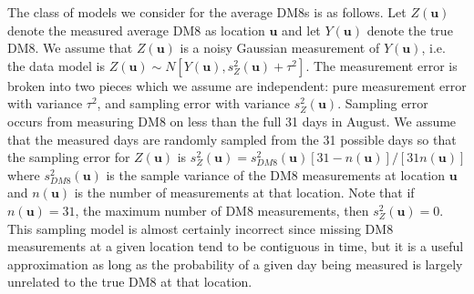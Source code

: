 \documentclass[12pt]{article}
\begin{document}
The class of models we consider for the average DM8s is as follows. Let $Z(\bm{u})$ denote the measured average DM8 as location $\bm{u}$ and let $Y(\bm{u})$ denote the true DM8. We assume that $Z(\bm{u})$ is a noisy Gaussian measurement of $Y(\bm{u})$, i.e. the data model is $Z(\bm{u}) \sim N[Y(\bm{u}), s_Z^2(\bm{u}) + \tau^2]$. The measurement error is broken into two pieces which we assume are independent: pure measurement error with variance $\tau^2$, and sampling error with variance $s_Z^2(\bm{u})$. Sampling error occurs from measuring DM8 on less than the full 31 days in August. We assume that the measured days are randomly sampled from the 31 possible days so that the sampling error for $Z(\bm{u})$ is $s_Z^2(\bm{u}) = s^2_{DM8}(\bm{u})[31 - n(\bm{u})]/[31n(\bm{u})]$ where $s^2_{DM8}(\bm{u})$ is the sample variance of the DM8 measurements at location $\bm{u}$ and $n(\bm{u})$ is the number of measurements at that location. Note that if $n(\bm{u})=31$, the maximum number of DM8 measurements, then $s^2_Z(\bm{u}) = 0$. This sampling model is almost certainly incorrect since missing DM8 measurements at a given location tend to be contiguous in time, but it is a useful approximation as long as the probability of a given day being measured is largely unrelated to the true DM8 at that location.
\end{document}
